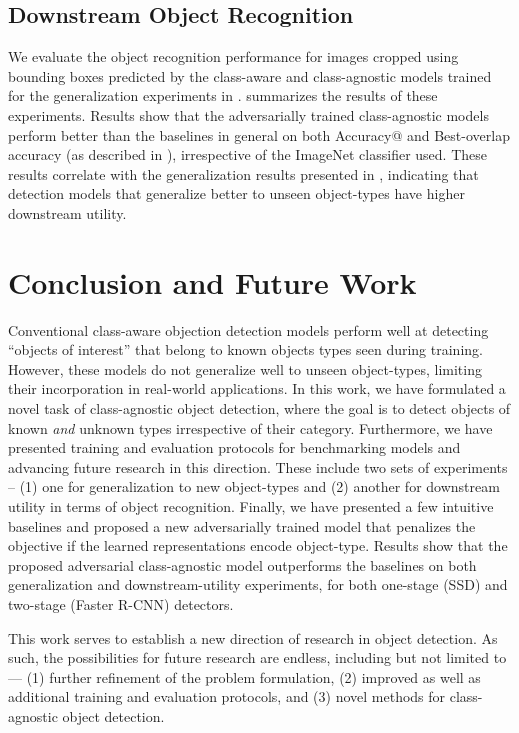 \documentclass[10pt,twocolumn,letterpaper]{article}
\begin{document}
\subsection{Downstream Object Recognition}

We evaluate the object recognition performance for images cropped using bounding boxes predicted by the class-aware and class-agnostic models trained for the generalization experiments in .  summarizes the results of these experiments. Results show that the adversarially trained class-agnostic models perform better than the baselines in general on both Accuracy@ and Best-overlap accuracy (as described in ), irrespective of the ImageNet classifier used. These results correlate with the generalization results presented in , indicating that detection models that generalize better to unseen object-types have higher downstream utility.
 \section{Conclusion and Future Work}
\label{sec:conclusion}

Conventional class-aware objection detection models perform well at detecting ``objects of interest'' that belong to known objects types seen during training. However, these models do not generalize well to unseen object-types, limiting their incorporation in real-world applications. In this work, we have formulated a novel task of class-agnostic object detection, where the goal is to detect objects of known \emph{and} unknown types irrespective of their category. Furthermore, we have presented training and evaluation protocols for benchmarking models and advancing future research in this direction. These include two sets of experiments -- (1) one for generalization to new object-types and (2) another for downstream utility in terms of object recognition. Finally, we have presented a few intuitive baselines and proposed a new adversarially trained model that penalizes the objective if the learned representations encode object-type. Results show that the proposed adversarial class-agnostic model outperforms the baselines on both generalization and downstream-utility experiments, for both one-stage (SSD) and two-stage (Faster R-CNN) detectors.

This work serves to establish a new direction of research in object detection. As such, the possibilities for future research are endless, including but not limited to --- (1) further refinement of the problem formulation, (2) improved as well as additional training and evaluation protocols, and (3) novel methods for class-agnostic object detection. 
{\small


}
\end{document}
